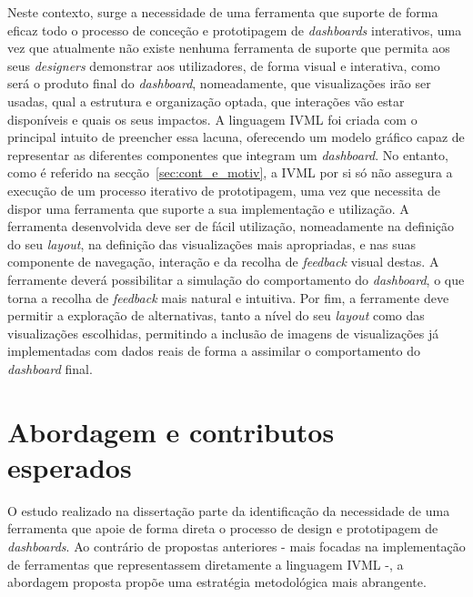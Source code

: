 Neste contexto, surge a necessidade de uma ferramenta que suporte de forma eficaz todo o processo de conceção e prototipagem de \textit{dashboards} interativos, uma vez que atualmente não existe nenhuma ferramenta de suporte que permita aos seus \textit{designers} demonstrar aos utilizadores, de forma visual e interativa, como será o produto final do \textit{dashboard}, nomeadamente, que visualizações irão ser usadas, qual a estrutura e organização optada, que interações vão estar disponíveis e quais os seus impactos. A linguagem \gls{IVML} foi criada com o principal intuito de preencher essa lacuna, oferecendo um modelo gráfico capaz de representar as diferentes componentes que integram um \textit{dashboard}. No entanto, como é referido na secção~\ref{sec:cont_e_motiv}, a \gls{IVML} por si só não assegura a execução de um processo iterativo de prototipagem, uma vez que necessita de dispor uma ferramenta que suporte a sua implementação e utilização. A ferramenta desenvolvida deve ser de fácil utilização, nomeadamente na definição do seu \textit{layout}, na definição das visualizações mais apropriadas, e nas suas componente de navegação, interação e da recolha de \textit{feedback} visual destas. A ferramente deverá possibilitar a simulação do comportamento do \textit{dashboard}, o que torna a recolha de \textit{feedback} mais natural e intuitiva. Por fim, a ferramente deve permitir a exploração de alternativas, tanto a nível do seu \textit{layout} como das visualizações escolhidas, permitindo a inclusão de imagens de visualizações já implementadas com dados reais de forma a assimilar o comportamento do \textit{dashboard} final.

\section{Abordagem e contributos esperados}
\label{sec:contribuicoes}

O estudo realizado na dissertação parte da identificação da necessidade de uma ferramenta que apoie de forma direta o processo de design e prototipagem de \textit{dashboards}. Ao contrário de propostas anteriores - mais focadas na implementação de ferramentas que representassem diretamente a linguagem \gls{IVML} -, a abordagem proposta propõe uma estratégia metodológica mais abrangente.

